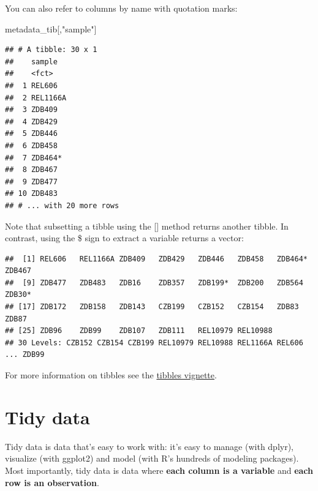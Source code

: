 \documentclass[
]{book}
\newenvironment{Shaded}{\begin{snugshade}}{\end{snugshade}}
\newcommand{\NormalTok}[1]{#1}
\newcommand{\SpecialCharTok}[1]{\textcolor[rgb]{0.00,0.00,0.00}{#1}}
\newcommand{\StringTok}[1]{\textcolor[rgb]{0.31,0.60,0.02}{#1}}
\begin{document}
You can also refer to columns by name with quotation marks:

\begin{Shaded}
\begin{Highlighting}[]
\NormalTok{metadata\_tib[,}\StringTok{"sample"}\NormalTok{]}
\end{Highlighting}
\end{Shaded}

\begin{verbatim}
## # A tibble: 30 x 1
##    sample  
##    <fct>   
##  1 REL606  
##  2 REL1166A
##  3 ZDB409  
##  4 ZDB429  
##  5 ZDB446  
##  6 ZDB458  
##  7 ZDB464* 
##  8 ZDB467  
##  9 ZDB477  
## 10 ZDB483  
## # ... with 20 more rows
\end{verbatim}

Note that subsetting a tibble using the {[}{]} method returns another tibble. In contrast, using the \$ sign to extract a variable returns a vector:

\begin{Shaded}
\end{Shaded}

\begin{verbatim}
##  [1] REL606   REL1166A ZDB409   ZDB429   ZDB446   ZDB458   ZDB464*  ZDB467  
##  [9] ZDB477   ZDB483   ZDB16    ZDB357   ZDB199*  ZDB200   ZDB564   ZDB30*  
## [17] ZDB172   ZDB158   ZDB143   CZB199   CZB152   CZB154   ZDB83    ZDB87   
## [25] ZDB96    ZDB99    ZDB107   ZDB111   REL10979 REL10988
## 30 Levels: CZB152 CZB154 CZB199 REL10979 REL10988 REL1166A REL606 ... ZDB99
\end{verbatim}

For more information on tibbles see the \href{https://cran.r-project.org/web/packages/tibble/vignettes/tibble.html}{tibbles vignette}.

\hypertarget{tidy-data}{%
\section{Tidy data}\label{tidy-data}}

Tidy data is data that's easy to work with: it's easy to manage (with dplyr), visualize (with ggplot2) and model (with R's hundreds of modeling packages). Most importantly, tidy data is data where \textbf{each column is a variable} and \textbf{each row is an observation}.
\end{document}
